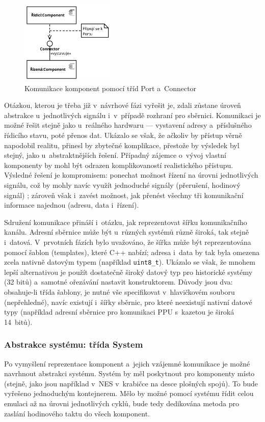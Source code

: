 \begin{figure}[ht!]
	\centering
	\caption{Komunikace komponent pomocí tříd Port a~Connector}\label{fig:navrh-komunikace-komponent}
	\includegraphics[width=0.4\textwidth]{images/port_connector.pdf}
\end{figure}

Otázkou, kterou je třeba již v~návrhové fázi vyřešit je, zdali zůstane úroveň abstrakce u~jednotlivých signálu i~v~případě rozhraní pro sběrnici. Komunikaci je možné řešit stejně jako u~reálného hardwaru --- vystavení adresy a~příslušného řídicího stavu, poté přenos dat. Ukázalo se však, že ačkoliv by přístup věrně napodobil realitu, přinesl by zbytečné komplikace, přestože by výsledek byl stejný, jako u~abstraktnějších řešení. Případný zájemce o~vývoj vlastní komponenty by mohl být odrazen komplikovaností realistického přístupu. Výsledné řešení je kompromisem: ponechat možnost řízení na úrovni jednotlivých signálu, což by mohly navíc využít jednoduché signály (přerušení, hodinový signál) ; zároveň však i~zavést možnost, jak přenést všechny tři komunikační informace najednou (adresu, data i~řízení).

Sdružení komunikace přináší i~otázku, jak reprezentovat šířku komunikačního kanálu. Adresní sběrnice může být u~různých systémů různě široká, tak stejně i~datová. V~prvotních fázích bylo uvažováno, že šířka může být reprezentována pomocí šablon (templates), které C++ nabízí; adresa i~data by tak byla omezena zcela nativně datovým typem (například \texttt{uint8\_t}). Ukázalo se však, že mnohem lepší alternativou je použít dostatečně široký datový typ pro historické systémy (32 bitů) a~samotné ořezávání nastavit konstruktorem. Důvody jsou dva: obsahuje-li třída šablony, je nutné vše specifikovat v~hlavičkovém souboru (nepřehledné), navíc existují i~šířky sběrnic, pro které neexistují nativní datové typy (například adresní sběrnice pro komunikaci PPU s~kazetou je široká 14~bitů).

\subsubsection{Abstrakce systému: třída System}
Po vymyšlení reprezentace komponent a~jejich vzájemné komunikace je možné navrhnout abstrakci systému. Systém by měl poskytnout pro komponenty místo (stejně, jako jsou například v~NES v~krabičce na desce plošných spojů). To bude vyřešeno jednoduchým kontejnerem. Mělo by možné pomocí systému řídit celou emulaci až na úrovni jednotlivých cyklů, bude tedy dedikována metoda pro zaslání hodinového taktu do všech komponent.

